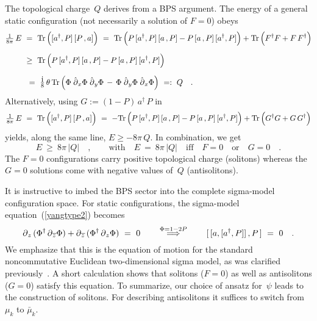 \documentclass[a4paper,11pt]{article}
\numberwithin{equation}{section}
\def\i{\mbox{i}}
\def\pa{\mbox{$\partial$}}
\def\sfrac#1#2{{\textstyle\frac{#1}{#2}}}
\newcommand{\adag}{a^{\dagger}}
\newcommand{\zb}{\overline{z}}
\begin{document}
The topological charge~$Q$ derives from a BPS argument.
The energy of a general static configuration
(not necessarily a solution of $F{=}0$) obeys
\begin{align}
\sfrac{1}{8\pi}\,E\ &=\ \mbox{Tr}\,\Bigl([\adag,P]\,[P\,,a]\Bigr)\ =\
\mbox{Tr}\,\Bigl( P\,[\adag,P]\,[a\,,P]-P\,[a\,,P]\,[\adag,P] \Bigr) +
\mbox{Tr}\,\Bigl( F^\dagger F + F\,F^\dagger \Bigr)
\nonumber\\[6pt]  &\ge\
\mbox{Tr}\,\Bigl( P\,[\adag,P]\,[a\,,P]-P\,[a\,,P]\,[\adag,P] \Bigr)
\nonumber\\[6pt]  &\ =\
\sfrac{\i}{8}\,\theta\,\mbox{Tr}\,\Bigl(
\Phi\;\hat{\pa}_x\Phi\;\hat{\pa}_y\Phi\,-\,
\Phi\;\hat{\pa}_y\Phi\;\hat{\pa}_x\Phi \Bigr)
\ =:\ Q \quad.
\end{align}
Alternatively, using $G:=(1-P)\,\adag\,P$ in
\begin{equation}
\sfrac{1}{8\pi}\,E\ =\ \mbox{Tr}\,\Bigl([\adag,P]\,[P\,,a]\Bigr)\ =\ -
\mbox{Tr}\,\Bigl( P\,[\adag,P]\,[a\,,P]-P\,[a\,,P]\,[\adag,P] \Bigr) +
\mbox{Tr}\,\Bigl( G^\dagger G + G\,G^\dagger \Bigr)
\end{equation}
yields, along the same line, $E\ge-8\pi\,Q$.
In combination, we get
\begin{equation}
E\ \ge\ 8\pi\,|Q| \quad,
\qquad\textrm{with}\quad
E\ =\ 8\pi\,|Q| \quad\textrm{iff}\quad
F=0 \quad\textrm{or}\quad G=0 \quad.
\end{equation}
The $F{=}0$ configurations carry positive topological charge (solitons)
whereas the $G{=}0$ solutions come with negative values of~$Q$ (antisolitons).

It is instructive to imbed the BPS sector into the complete sigma-model
configuration space.
For static configurations, the sigma-model equation~(\ref{yangtype2}) becomes
\begin{equation} \label{yangtypeZ}
\pa_z\,(\Phi^{\dagger}\,\pa_{\zb}\Phi)+
\pa_{\zb}\,(\Phi^{\dagger}\,\pa_z\Phi)\ =\ 0
\qquad\buildrel{\Phi=1-2P}\over{\Longrightarrow}\qquad
[\,[a,[\adag,P]]\,,P\,]\ =\ 0 \quad.
\end{equation}
We emphasize that this is the equation of motion for the standard
noncommutative Euclidean two-dimensional sigma model, as was clarified
previously~\cite{LPS2}.  A short calculation shows that
solitons ($F{=}0$) as well as antisolitons ($G{=}0$) satisfy this equation.
To summarize, our choice of ansatz for~$\psi$ leads to the construction
of solitons. For describing antisolitons it suffices to switch from
$\mu_k$ to $\bar{\mu}_k$.
\end{document}
